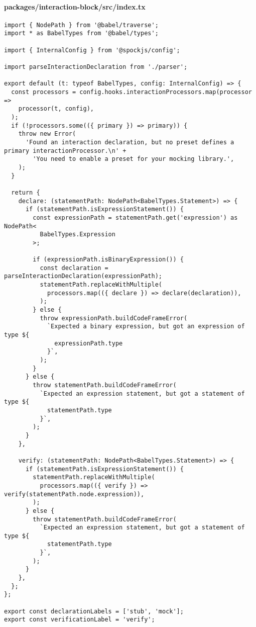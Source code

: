 \paragraph*{packages/interaction-block/src/index.tx}
\begin{verbatim}
import { NodePath } from '@babel/traverse';
import * as BabelTypes from '@babel/types';

import { InternalConfig } from '@spockjs/config';

import parseInteractionDeclaration from './parser';

export default (t: typeof BabelTypes, config: InternalConfig) => {
  const processors = config.hooks.interactionProcessors.map(processor =>
    processor(t, config),
  );
  if (!processors.some(({ primary }) => primary)) {
    throw new Error(
      'Found an interaction declaration, but no preset defines a primary interactionProcessor.\n' +
        'You need to enable a preset for your mocking library.',
    );
  }

  return {
    declare: (statementPath: NodePath<BabelTypes.Statement>) => {
      if (statementPath.isExpressionStatement()) {
        const expressionPath = statementPath.get('expression') as NodePath<
          BabelTypes.Expression
        >;

        if (expressionPath.isBinaryExpression()) {
          const declaration = parseInteractionDeclaration(expressionPath);
          statementPath.replaceWithMultiple(
            processors.map(({ declare }) => declare(declaration)),
          );
        } else {
          throw expressionPath.buildCodeFrameError(
            `Expected a binary expression, but got an expression of type ${
              expressionPath.type
            }`,
          );
        }
      } else {
        throw statementPath.buildCodeFrameError(
          `Expected an expression statement, but got a statement of type ${
            statementPath.type
          }`,
        );
      }
    },

    verify: (statementPath: NodePath<BabelTypes.Statement>) => {
      if (statementPath.isExpressionStatement()) {
        statementPath.replaceWithMultiple(
          processors.map(({ verify }) => verify(statementPath.node.expression)),
        );
      } else {
        throw statementPath.buildCodeFrameError(
          `Expected an expression statement, but got a statement of type ${
            statementPath.type
          }`,
        );
      }
    },
  };
};

export const declarationLabels = ['stub', 'mock'];
export const verificationLabel = 'verify';
\end{verbatim}


